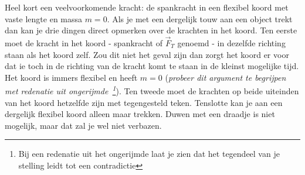 Heel kort een veelvoorkomende kracht: de spankracht in een flexibel koord met
vaste lengte en massa $m=0$. Als je met een dergelijk touw aan een object trekt dan
kan je drie dingen direct opmerken over de krachten in het koord. Ten eerste moet
de kracht in het koord - spankracht of $\vec{F}_T$ genoemd - in dezelfde richting
staan als het koord zelf. Zou dit niet het geval zijn dan zorgt het koord er voor dat 
ie toch in de richting van de kracht komt te staan in de kleinst mogelijke tijd. Het
koord is immers flexibel en heeft $m=0$ ({\it probeer dit argument te begrijpen met
redenatie uit ongerijmde~\footnote{Bij een redenatie uit het ongerijmde laat je zien dat het tegendeel van 
je stelling leidt tot een contradictie}}). Ten tweede moet de krachten op beide uiteinden van
het koord hetzelfde zijn met tegengesteld teken.  Tenslotte kan je aan een dergelijk 
flexibel koord alleen maar trekken. Duwen met een draadje is niet mogelijk, maar
dat zal je wel niet verbazen.

